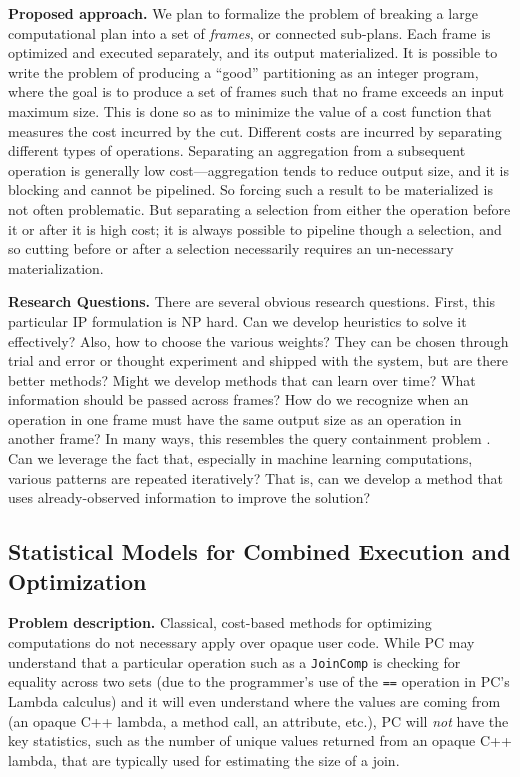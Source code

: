 \vspace{5 pt} 
\noindent
\textbf{Proposed approach.}
We plan to formalize the problem of breaking a large computational plan into a set of \emph{frames}, or connected sub-plans.
Each frame is optimized and executed separately, and its output materialized.
It is possible
to write the problem of producing a ``good'' partitioning
as an integer program, where the goal is to produce a set of frames such that no frame exceeds an input maximum size.
This is done so as to minimize the value of a cost function that measures the cost incurred by the cut.
Different
costs are incurred by separating different types of operations.  Separating an aggregation from a subsequent operation
is generally low cost---aggregation tends to reduce output size, and it is blocking and cannot be pipelined. So forcing
such a result to be materialized is not often problematic.
But separating
a selection from either the operation before it or after it is high cost; it is always possible to pipeline though a selection, and
so cutting before or after a selection necessarily requires an un-necessary materialization.  

\vspace{5 pt}
\noindent
\textbf{Research Questions.}  There are several obvious research questions.  First, this particular IP formulation is NP hard.  Can
we develop heuristics to solve it effectively?  Also, how to choose the various weights?  They can be chosen through trial and error
or thought experiment and shipped with the system, but are there better methods?  Might we develop methods that can learn
over time?
What information should be passed across frames?  How do we recognize when an operation in one frame must have the same output
size as an operation in another frame?  In many ways, this resembles the query containment problem \cite{calvanese1998decidability, kolaitis1998conjunctive}.
Can we leverage the fact that, especially in machine learning computations, various patterns are repeated
iteratively?
That is, can we develop a method that uses already-observed information to improve the solution?

\subsection{Statistical Models for Combined Execution and Optimization}

\noindent
\textbf{Problem description.}
Classical, cost-based methods for optimizing computations do not necessary apply over opaque user code.
While PC may understand that
a particular operation such as a \texttt{JoinComp} is checking for equality across two sets (due to the programmer's
use of the \texttt{==} operation
in PC's Lambda calculus) and it will even understand where the values are coming from (an opaque C++ lambda, a method call, an attribute,
etc.), PC will \emph{not} have the key statistics, such as the number of unique values returned from an opaque C++ lambda, 
that are typically used for estimating the size of a join.  

